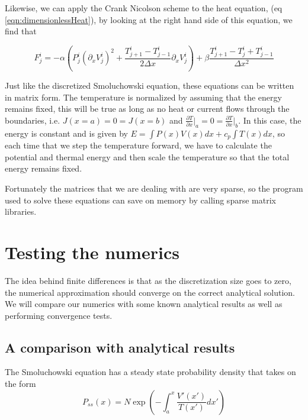 Likewise, we can apply the Crank Nicolson scheme to the heat equation, (eq \ref{eqn:dimensionlessHeat}), by looking at the right hand side of this equation, we find that

\begin{equation}
F_j^i = -\alpha \left (P_j^i (\partial_x V_j^i)^2 + \frac{T_{j+1}^i - T_{j-1}^i }{2 \Delta x}\partial_x V_j^i  \right) + \beta \frac{T_{j+1}^i - T_j^i + T_{j-1}^i}{\Delta x^2}
\end{equation}

Just like the discretized Smoluchowski equation, these equations can be written in matrix form. The temperature is normalized by assuming that the energy remains fixed, this will be true as long as no heat or current flows through the boundaries, i.e. $J(x=a) = 0 = J(x = b)$ and $\frac{\partial T}{\partial x} \rvert_a = 0 = \frac{\partial T}{\partial x} \rvert_b$. In this case, the energy is constant and is given by $E = \int P(x) V(x) dx + c_p \int T(x) dx$, so each time that we step the temperature forward, we have to calculate the potential and thermal energy and then scale the temperature so that the total energy remains fixed.

Fortunately the matrices that we are dealing with are very sparse, so the program used to solve these equations can save on memory by calling sparse matrix libraries. 

\section{Testing the numerics}

The idea behind finite differences is that as the discretization size goes to zero, the numerical approximation should converge on the correct analytical solution. We will compare our numerics with some known analytical results as well as performing convergence tests.
\subsection{A comparison with analytical results}

The Smoluchowski equation has a steady state probability density that takes on the form
\begin{equation}
P_{ss}(x) = N \exp{\left(-\int_a^x \frac{V'(x')}{T(x')} dx' \right)} \label{eqn:analSteadyState}
\end{equation}

